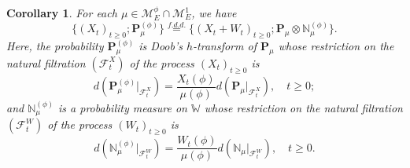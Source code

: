 \documentclass[12pt, a4paper]{amsart}
\newtheorem{cro}[thm]{Corollary}
\theoremstyle{definition}
\numberwithin{equation}{section}
\begin{document}
\begin{cro}
	For each $\mu \in \mathcal M_E^\phi \cap \mathcal M_E^1$, we have
\begin{equation}
	\{(X_t)_{t\geq 0}; \mathbf P_\mu^{(\phi)}\}
	\overset{f.d.d.}{=} \{(X_t + W_t)_{t\geq 0}; \mathbf P_\mu \otimes \mathbb N^{(\phi)}_\mu\}.
\end{equation}
	Here, the probability $\mathbf P_\mu^{(\phi)}$ is Doob's $h$-transform of $\mathbf P_\mu$ whose restriction on the natural filtration $(\mathscr F_t^X)$ of the process $(X_t)_{t\geq 0}$ is
\begin{equation}
	d ( \mathbf P_\mu^{(\phi)}|_{\mathscr F_t^X}) 
	= \frac{X_t(\phi)}{ \mu(\phi)} d(\mathbf P_\mu|_{\mathscr F_t^X}),
	\quad t\geq 0;
\end{equation}
	and $\mathbb N_\mu^{(\phi)}$ is a probability measure on $\mathbb W$ whose restriction on the natural filtration $(\mathscr F_t^W)$ of the process $(W_t)_{t\geq 0}$ is
\begin{equation}
	d(\mathbb N_\mu^{(\phi)} |_{\mathscr F^W_t}  )
	= \frac{W_t(\phi)}{\mu(\phi)} d(\mathbb N_\mu |_{\mathscr F^W_t}  ),
	\quad t\geq 0.
\end{equation}
\end{cro}
\end{document}
